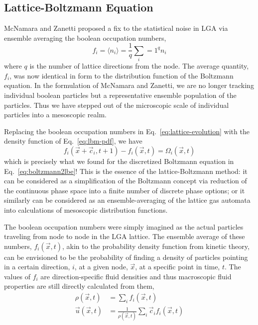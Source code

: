 \subsection{Lattice-Boltzmann Equation}

McNamara and Zanetti proposed a fix to the statistical noise in LGA via ensemble averaging the boolean occupation numbers,\cite{McNamara1988}
\begin{equation}\label{eq:lbm-pdf}
	f_i = \langle n_i \rangle = \frac{1}{q}\sum_i=1^qn_i
\end{equation}
where $q$ is the number of lattice directions from the node. The average quantity, $f_i$, was now identical in form to the distribution function of the Boltzmann equation. In the formulation of McNamara and Zanetti, we are no longer tracking individual boolean particles but a representative ensemble population of the particles. Thus we have stepped out of the microscopic scale of individual particles into a mesoscopic realm. 

Replacing the boolean occupation numbers in Eq.~\ref{eq:lattice-evolution} with the density function of Eq.~\ref{eq:lbm-pdf}, we have
\begin{equation}\label{eq:lbm-evolution}
	f_i(\vec{x}+\vec{c}_i, t + 1) - f_i(\vec{x},t) = \Omega_i(\vec{x},t)
\end{equation}
which is precisely what we found for the discretized Boltzmann equation in Eq.~\ref{eq:boltzmann2lbe}! This is the essence of the lattice-Boltzmann method: it can be considered as a simplification of the Boltzmann concept via reduction of the continuous phase space into a finite number of discrete phase options; or it similarly can be considered as an ensemble-averaging of the lattice gas automata into calculations of mesoscopic distribution functions.

The boolean occupation numbers were simply imagined as the actual particles traveling from node to node in the LGA lattice. The ensemble average of these numbers, $f_i(\vec{x},t)$, akin to the probability density function from kinetic theory, can be envisioned to be the probability of finding a density of particles pointing in a certain direction, $i$, at a given node, $\vec{x}$, at a specific point in time, $t$. The values of $f_i$ are direction-specific fluid densities and thus macroscopic fluid properties are still directly calculated from them,
\begin{subequations}\label{eq:lbm2physical}
\begin{align}
	\rho(\vec{x},t) &= \sum_i f_i(\vec{x},t)\\
	\vec{u}(\vec{x},t) &= \frac{1}{\rho(\vec{x},t)}\sum_i \vec{c}_if_i(\vec{x},t)
\end{align}
\end{subequations}

